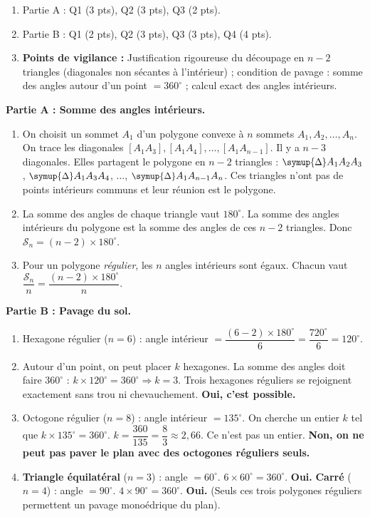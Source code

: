 \documentclass[11pt]{article}
\def\triangle{\mathord{\scalebox{0.9}{$\symup{\Delta}$}}}%
\begin{document}
\begin{corrige}
\begin{aretenir}
\begin{enumerate}
\item Partie A : Q1 (3 pts), Q2 (3 pts), Q3 (2 pts).
\item Partie B : Q1 (2 pts), Q2 (3 pts), Q3 (3 pts), Q4 (4 pts).
\item \textbf{Points de vigilance :} Justification rigoureuse du découpage en $n-2$ triangles (diagonales non sécantes à l'intérieur) ; condition de pavage : somme des angles autour d'un point $=360^{\circ}$ ; calcul exact des angles intérieurs.
\end{enumerate}
\end{aretenir}

\textbf{Partie A : Somme des angles intérieurs.}
\begin{enumerate}
\item On choisit un sommet $A_1$ d'un polygone convexe à $n$ sommets $A_1, A_2, \dots, A_n$. On trace les diagonales $[A_1A_3], [A_1A_4], \dots, [A_1A_{n-1}]$. Il y a $n-3$ diagonales. Elles partagent le polygone en $n-2$ triangles : $\triangle A_1A_2A_3$, $\triangle A_1A_3A_4$, $\dots$, $\triangle A_1A_{n-1}A_n$. Ces triangles n'ont pas de points intérieurs communs et leur réunion est le polygone.
\item La somme des angles de chaque triangle vaut $180^{\circ}$. La somme des angles intérieurs du polygone est la somme des angles de ces $n-2$ triangles. Donc $\mathcal{S}_n = (n-2)\times 180^{\circ}$.
\item Pour un polygone \emph{régulier}, les $n$ angles intérieurs sont égaux. Chacun vaut $\dfrac{\mathcal{S}_n}{n} = \dfrac{(n-2)\times 180^{\circ}}{n}$.
\end{enumerate}

\textbf{Partie B : Pavage du sol.}
\begin{enumerate}
\item Hexagone régulier ($n=6$) : angle intérieur $= \dfrac{(6-2)\times 180^{\circ}}{6} = \dfrac{720^{\circ}}{6} = 120^{\circ}$.
\item Autour d'un point, on peut placer $k$ hexagones. La somme des angles doit faire $360^{\circ}$ : $k \times 120^{\circ} = 360^{\circ} \Rightarrow k=3$. Trois hexagones réguliers se rejoignent exactement sans trou ni chevauchement. \textbf{Oui, c'est possible.}
\item Octogone régulier ($n=8$) : angle intérieur $= 135^{\circ}$.
On cherche un entier $k$ tel que $k \times 135^{\circ} = 360^{\circ}$.
$k = \dfrac{360}{135} = \dfrac{8}{3} \approx 2,66$. Ce n'est pas un entier. \textbf{Non, on ne peut pas paver le plan avec des octogones réguliers seuls.}
\item \textbf{Triangle équilatéral} ($n=3$) : angle $= 60^{\circ}$. $6 \times 60^{\circ} = 360^{\circ}$. \textbf{Oui.}
\textbf{Carré} ($n=4$) : angle $= 90^{\circ}$. $4 \times 90^{\circ} = 360^{\circ}$. \textbf{Oui.}
(Seuls ces trois polygones réguliers permettent un pavage monoédrique du plan).
\end{enumerate}
\end{corrige}
\end{document}
